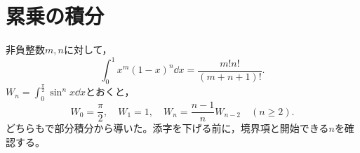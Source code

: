 \section{累乗の積分}
非負整数$m,n$に対して，
\[
 \int_0^1x^m(1-x)^n\dd x=\frac{m!n!}{(m+n+1)!}.
\]
$W_n=\int_0^{\frac\pi2}\sin^n x\dd x$とおくと，
\[
 W_0=\frac\pi2,\quad W_1=1,\quad
 W_n=\frac{n-1}{n}W_{n-2}\quad(n\ge2).
\]
どちらもで部分積分から導いた。添字を下げる前に，境界項と開始できる$n$を確認する。

